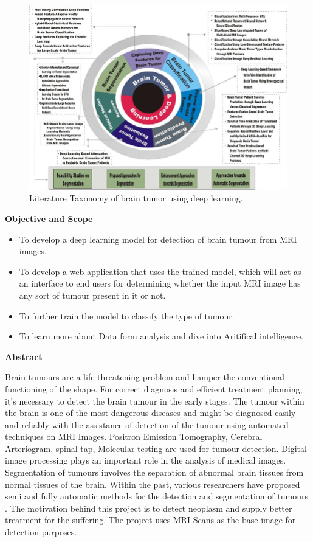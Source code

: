 \begin{landscape}
\begin{figure}[H]
  \includegraphics[scale=0.65]{taxonomy_brain.jpg}
  \caption{Literature Taxonomy of brain tumor using deep learning.} \label{fig:ishan}
\end{figure}
\end{landscape}
{\bf \Large Objective and Scope}
\begin{itemize}
    \item To develop a deep learning model for detection of brain tumour from MRI images.
    \item To develop a web application that uses the trained model, which will act as an interface to end users for determining whether the input MRI image has any sort of tumour present in it or not.
    \item To further train the model to classify the type of tumour.
    \item To learn more about Data form analysis and dive into Aritifical intelligence.
\end{itemize}
{\bf \Large Abstract}\par
Brain tumours are a life-threatening problem and hamper the conventional functioning of the shape. For correct diagnosis and efficient treatment planning, it's necessary to detect the brain tumour in the early stages. The tumour within the brain is one of the most dangerous diseases and might be diagnosed easily and reliably with the assistance of detection of the tumour using automated techniques on MRI Images. Positron Emission Tomography, Cerebral Arteriogram, spinal tap, Molecular testing are used for tumour detection. Digital image processing plays an important role in the analysis of medical images. Segmentation of tumours involves the separation of abnormal brain tissues from normal tissues of the brain. Within the past, various researchers have proposed semi and fully automatic methods for the detection and segmentation of tumours . The motivation behind this project is to detect neoplasm and supply better treatment for the suffering. The project uses MRI Scans as the base image for detection purposes.\\
